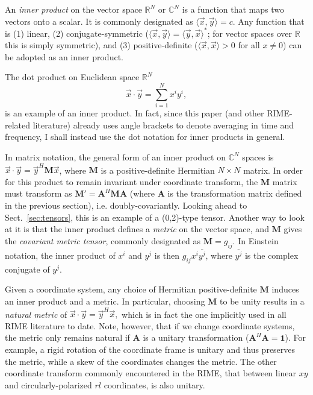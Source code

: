 \documentclass[]{aa}
\newcommand{\herm}{H}
\begin{document}
\newcommand{\inprod}[2]{\langle #1,#2 \rangle}

An \emph{inner product} on the vector space $\mathbb{R}^N$ or $\mathbb{C}^N$ is a function that maps two vectors onto a scalar. It is commonly designated as $\inprod{\vec x}{\vec y}=c$. Any function that is (1) linear, (2) conjugate-symmetric ($\inprod{\vec x}{\vec y}=\inprod{\vec y}{\vec x}^*$; for vector spaces over $\mathbb{R}$ this is simply symmetric), and (3) positive-definite ($\inprod{\vec x}{\vec x}>0$ for all $x\ne0$) can be adopted as an inner product. 

The dot product on Euclidean space $\mathbb{R}^N$ \[ \vec x\cdot \vec y = \sum_{i=1}^{N}x^iy^i, \] is an example of an inner product. In fact, since this paper (and other RIME-related literature) already uses angle brackets to denote averaging in time and frequency, I shall instead use the dot notation for inner products in general.

In matrix notation, the general form of an inner product on $\mathbb{C}^N$ spaces is $\vec x\cdot \vec y = \vec y^\herm \mathbf{M} \vec x$, where $\mathbf{M}$ is a positive-definite Hermitian $N\times N$ matrix. In order for this product to remain invariant under coordinate transform, the $\mathbf{M}$ matrix must transform as $\mathbf{M}'=\mathbf{A}^\herm \mathbf{M} \mathbf{A}$ (where $\mathbf{A}$ is the transformation matrix defined in the previous section), i.e. doubly-covariantly. Looking ahead to Sect.~\ref{sec:tensors}, this is an example of a (0,2)-type tensor. Another way to look at it is that the inner product defines a \emph{metric} on the vector space, and $\mathbf{M}$ gives the \emph{covariant metric tensor}, commonly designated as $\mathbf{M}=g_{ij}$. In Einstein notation, the inner product of $x^i$ and $y^j$ is then $g_{ij} x^i \overline{y^j}$, where $\overline{y^j}$ is the complex conjugate of $y^j$.

Given a coordinate system, any choice of Hermitian positive-definite $\mathbf{M}$ induces an inner product and a metric. In particular, choosing 
$\mathbf{M}$ to be unity results in a \emph{natural metric} of $\vec x \cdot \vec y=\vec y^\herm\vec x,$ which is in fact the one implicitly used in all RIME literature to date. Note, however, that if we change coordinate systems, the metric only remains natural if $\mathbf{A}$ is a unitary transformation ($\mathbf{A}^\herm \mathbf{A}=\mathbf{1}$). For example, a rigid rotation of the coordinate frame is unitary and thus preserves the metric, while a skew of the coordinates changes the metric. The other coordinate transform commonly encountered in the RIME, that between linear $xy$ and circularly-polarized $rl$ coordinates, is also unitary.
\end{document}
